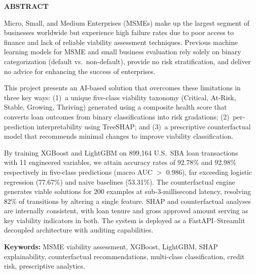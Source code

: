 \documentclass[12pt,a4paper]{report}
\begin{document}

\newpage
\begin{center}
{\Large\bfseries ABSTRACT\\[1cm]}
\end{center}

Micro, Small, and Medium Enterprises (MSMEs) make up the largest segment of businesses worldwide but experience high failure rates due to poor access to finance and lack of reliable viability assessment techniques. Previous machine learning models for MSME and small business evaluation rely solely on binary categorization (default vs.\ non-default), provide no risk stratification, and deliver no advice for enhancing the success of enterprises.

This project presents an AI-based solution that overcomes these limitations in three key ways: (1)~a unique five-class viability taxonomy (Critical, At-Risk, Stable, Growing, Thriving) generated using a composite health score that converts loan outcomes from binary classifications into risk gradations; (2)~per-prediction interpretability using TreeSHAP; and (3)~a prescriptive counterfactual model that recommends minimal changes to improve viability classification.

By training XGBoost and LightGBM on 899,164 U.S.\ SBA loan transactions with 11 engineered variables, we attain accuracy rates of 92.78\% and 92.98\% respectively in five-class predictions (macro AUC $>$ 0.986), far exceeding logistic regression (77.67\%) and naive baselines (53.31\%). The counterfactual engine generates viable solutions for 200 examples at sub-3-millisecond latency, resolving 82\% of transitions by altering a single feature. SHAP and counterfactual analyses are internally consistent, with loan tenure and gross approved amount serving as key viability indicators in both. The system is deployed as a FastAPI--Streamlit decoupled architecture with auditing capabilities.

\textbf{Keywords:} MSME viability assessment, XGBoost, LightGBM, SHAP explainability, counterfactual recommendations, multi-class classification, credit risk, prescriptive analytics.

\newpage
\tableofcontents

\newpage
\listoffigures
{}

\newpage
\listoftables
{}
\end{document}
